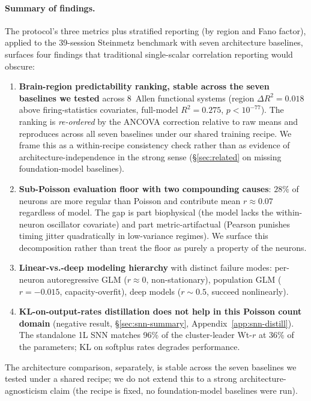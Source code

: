 \documentclass{article}
\begin{document}
\paragraph{Summary of findings.}
The protocol's three metrics plus stratified reporting (by region
and Fano factor), applied to the 39-session Steinmetz benchmark with
seven architecture baselines, surfaces four findings that
traditional single-scalar correlation reporting would obscure:
\begin{enumerate}[nosep, leftmargin=*, topsep=0pt]
  \item \textbf{Brain-region predictability ranking, stable across
    the seven baselines we tested} across 8~Allen functional systems
    (region $\Delta R^{2}{=}0.018$ above firing-statistics covariates,
    full-model $R^{2}{=}0.275$, $p{<}10^{-77}$).  The ranking is
    \emph{re-ordered} by the ANCOVA correction relative to raw means
    and reproduces across all seven baselines under our shared training
    recipe.  We frame this as a within-recipe consistency check rather
    than as evidence of architecture-independence in the strong sense
    (\S\ref{sec:related} on missing foundation-model baselines).
  \item \textbf{Sub-Poisson evaluation floor with two compounding
    causes}: $28\%$ of neurons are more regular than Poisson and
    contribute mean $r{\approx}0.07$ regardless of model.  The gap is
    part biophysical (the model lacks the within-neuron oscillator
    covariate) and part metric-artifactual (Pearson punishes timing
    jitter quadratically in low-variance regimes).  We surface this
    decomposition rather than treat the floor as purely a property
    of the neurons.
  \item \textbf{Linear-vs.-deep modeling hierarchy} with distinct
    failure modes: per-neuron autoregressive GLM
    ($r{\approx}0$, non-stationary), population GLM
    ($r{=}{-}0.015$, capacity-overfit), deep models ($r{\sim}0.5$,
    succeed nonlinearly).
  \item \textbf{KL-on-output-rates distillation does not help in
    this Poisson count domain} (negative result, \S\ref{sec:snn-summary},
    Appendix~\ref{app:snn-distill}).  The standalone 1L SNN matches
    96\% of the cluster-leader Wt-$r$ at $36\%$ of the parameters; KL
    on softplus rates degrades performance.
\end{enumerate}
The architecture comparison, separately, is stable across the seven
baselines we tested under a shared recipe; we do not extend this to a
strong architecture-agnosticism claim (the recipe is fixed, no
foundation-model baselines were run).
\end{document}
